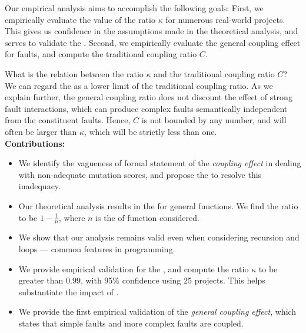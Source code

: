 \documentclass[preprint,nonatbib]{sigplanconf}\usepackage[]{graphicx}\usepackage[]{color}
\begin{document}
Our empirical analysis aims to accomplish the following goals: First, we
empirically evaluate the value of the \couplingC ratio $\kappa$ for numerous real-world projects.
This gives us confidence in the assumptions made in the theoretical analysis,
and serves to validate the \efaultT. Second, we empirically
evaluate the general coupling effect for faults, and compute the traditional coupling ratio $C$.

What is the relation between the \couplingC ratio $\kappa$ and the traditional coupling ratio $C$?
We can regard the \kappaT as a lower limit of the traditional
coupling ratio. As we explain further, the general coupling ratio does not
discount the effect of strong fault interactions, which can produce
complex faults semantically independent from the constituent faults.
Hence, $C$ is not bounded by any number, and will often be larger than
$\kappa$, which will be strictly less than one.
\\

\noindent\textbf{Contributions:}
\begin{itemize}
\item We identify the vagueness of formal statement of the \emph{coupling effect} in
dealing with non-adequate mutation scores,
 and propose the \efaultT to resolve this inadequacy.
\item Our theoretical analysis results in the \efaultT for
  general functions. We find the \couplingC ratio to be $1-\frac{1}{n}$,
  where $n$ is the \foutput of function considered.
\item We show that our analysis remains valid even when considering recursion
  and loops --- common features in programming.
\item We provide empirical validation for the \efaultT, and compute the
  \couplingC ratio $\kappa$ to be greater than $0.99$, with $95\%$ confidence using 25 projects.
  This helps substantiate the impact of \couplingC.
\item We provide the first empirical validation of the \emph{general coupling
  effect}, which states that simple faults and more complex faults are
coupled.
\end{itemize}
\end{document}
